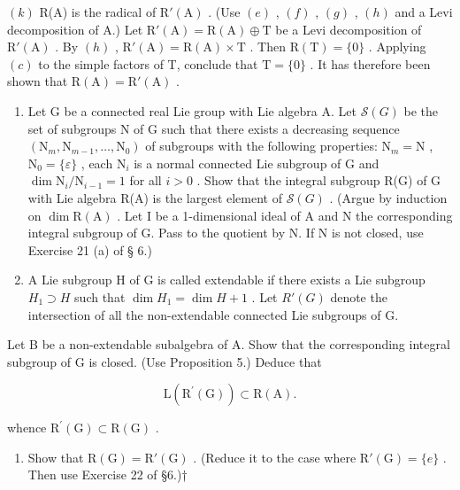 \((k)\) R(A) is the radical of \(\mathrm{R}'(\mathrm{A})\) . (Use \((e)\) , \((f)\) , \((g)\) , \((h)\) and a Levi decomposition of A.) Let \(\mathrm{R}'(\mathrm{A}) = \mathrm{R}(\mathrm{A}) \oplus \mathrm{T}\) be a Levi decomposition of \(\mathrm{R}'(\mathrm{A})\) . By \((h)\) , \(\mathrm{R}'(\mathrm{A}) = \mathrm{R}(\mathrm{A}) \times \mathrm{T}\) . Then \(\mathrm{R}(\mathrm{T}) = \{0\}\) . Applying \((c)\) to the simple factors of T, conclude that \(\mathrm{T} = \{0\}\) . It has therefore been shown that \(\mathrm{R}(\mathrm{A}) = \mathrm{R}'(\mathrm{A})\) .

\begin{enumerate}
\def\labelenumi{(\alph{enumi})}
\setcounter{enumi}{11}
\item
  Let G be a connected real Lie group with Lie algebra A. Let \(\mathcal{S}(G)\) be the set of subgroups N of G such that there exists a decreasing sequence \((\mathrm{N}_m, \mathrm{N}_{m-1}, \ldots, \mathrm{N}_0)\) of subgroups with the following properties: \(\mathrm{N}_m = \mathrm{N}\) , \(\mathrm{N}_0 = \{\varepsilon\}\) , each \(\mathrm{N}_i\) is a normal connected Lie subgroup of G and \(\dim \mathrm{N}_i / \mathrm{N}_{i-1} = 1\) for all \(i > 0\) . Show that the integral subgroup R(G) of G with Lie algebra R(A) is the largest element of \(\mathcal{S}(G)\) . (Argue by induction on \(\dim \mathrm{R(A)}\) . Let I be a 1-dimensional ideal of A and N the corresponding integral subgroup of G. Pass to the quotient by N. If N is not closed, use Exercise 21 (a) of § 6.)
\item
  A Lie subgroup H of G is called extendable if there exists a Lie subgroup \(H_{1} \supset H\) such that \(\dim H_{1} = \dim H + 1\) . Let \(R'(G)\) denote the intersection of all the non-extendable connected Lie subgroups of G.
\end{enumerate}

Let B be a non-extendable subalgebra of A. Show that the corresponding integral subgroup of G is closed. (Use Proposition 5.) Deduce that

\[
\mathrm{L} (\mathrm{R} ^ {\prime} (\mathrm{G})) \subset \mathrm{R} (\mathrm{A}).
\]

whence \(\mathrm{R}^{\prime}(\mathrm{G})\subset\mathrm{R}(\mathrm{G})\) .

\begin{enumerate}
\def\labelenumi{(\alph{enumi})}
\setcounter{enumi}{13}
\tightlist
\item
  Show that \(\mathrm{R}(\mathrm{G}) = \mathrm{R}'(\mathrm{G})\) . (Reduce it to the case where \(\mathrm{R}'(\mathrm{G}) = \{e\}\) . Then use Exercise 22 of §6.)†
\end{enumerate}

